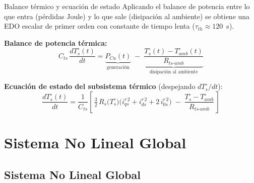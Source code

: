 \documentclass[aspectratio=169,t]{beamer}
\newcommand{\SecPresentacion}{Presentación del problema}
\newcommand{\SecMecanico}{Subsistema mecánico equivalente}
\newcommand{\SecElectromagnetico}{Subsistema electromagnético en coordenadas qd0}
\newcommand{\SecTermico}{Subsistema térmico}
\newcommand{\SecNLGlobal}{Sistema No Lineal Global}
\newcommand{\SecLPV}{Linealización Jacobiana (LPV)}
\newcommand{\SecLTI}{Obtención del modelo LTI equivalente}
\newcommand{\SecAnalisisLTI}{Análisis del modelo LTI aumentado}
\newcommand{\SecDinamica}{Respuesta dinámica en dominio del tiempo}
\newcommand{\SecControlador}{Diseño y análisis del controlador en cascada}
\newcommand{\SecVerifSpecs}{Verificación de desempeño: Especificaciones de operación}
\newcommand{\SecVerifOffset}{Verificación de desempeño: Offset de estado estacionario}
\newcommand{\SecVerifNoIdealidades}{Verificación de desempeño: No idealidades y comportamiento térmico}
\newcommand{\SecDiscretizacion}{Discretización del controlador}
\newcommand{\SecSoftware}{Codificación del software de control}
\newcommand{\AgendaItem}[3]{%
  \ifnum#1=#2
    {\scriptsize\bfseries\color{uncBlue}%
      \hyperlink{sec:#1}{\makebox[2.2em][r]{#1.}\hspace{0.7em}%
      \parbox[t]{0.86\textwidth}{#3}}\par}%
  \else
    {\scriptsize\color{black!26}%
      \hyperlink{sec:#1}{\makebox[2.2em][r]{#1.}\hspace{0.7em}%
      \parbox[t]{0.86\textwidth}{#3}}\par}%
  \fi
  \vspace{0.35mm}%
}
\newcommand{\AgendaBody}[1]{%
    \vspace{3mm}
    {\Large\bfseries\color{uncBlue}Tabla de contenidos\par}
    \vspace{2mm}
    \begin{minipage}{0.94\textwidth}
      \AgendaItem{1}{#1}{\SecPresentacion}
      \AgendaItem{2}{#1}{\SecMecanico}
      \AgendaItem{3}{#1}{\SecElectromagnetico}
      \AgendaItem{4}{#1}{\SecTermico}
      \AgendaItem{5}{#1}\SecNLGlobal
      \AgendaItem{6}{#1}{\SecLPV}
      \AgendaItem{7}{#1}{\SecLTI}
      \AgendaItem{8}{#1}{\SecAnalisisLTI}
      \AgendaItem{9}{#1}{\SecDinamica}
      \AgendaItem{10}{#1}{\SecControlador}
      \AgendaItem{11}{#1}{\SecVerifSpecs}
      \AgendaItem{12}{#1}{\SecVerifOffset}
      \AgendaItem{13}{#1}{\SecVerifNoIdealidades}
      \AgendaItem{14}{#1}{\SecDiscretizacion}
      \AgendaItem{15}{#1}{\SecSoftware}
    \end{minipage}
    \vfill
}
\newcommand{\AgendaSlideTarget}[2]{%
  \begin{frame}[plain]
    \hypertarget{#2}{}%
    \AgendaBody{#1}
  \end{frame}
}
\newcommand{\StartProjectSection}[2]{%
  \section{#2}%
  \subsection{#2}%
  \AgendaSlideTarget{#1}{sec:#1}%
}
\begin{document}
\begin{frame}{Balance térmico y ecuación de estado}
{\small\color{uncGray}Aplicando el balance de potencia entre lo que entra (pérdidas Joule) y lo que sale (disipación al ambiente) se obtiene una EDO escalar de primer orden con constante de tiempo lenta ($\tau_{th}\approx 120$~s).}\par
\vspace{3mm}

\textbf{Balance de potencia térmica:}
\begin{equation*}
C_{ts}\,\frac{dT_s^\circ(t)}{dt} = \underbrace{P_{Cu}(t)}_{\text{generación}} \;-\; \underbrace{\frac{T_s^\circ(t) - T_{amb}^\circ(t)}{R_{ts\text{-}amb}}}_{\text{disipación al ambiente}}
\end{equation*}

\textbf{Ecuación de estado del subsistema térmico} (despejando $dT_s^\circ/dt$):
\begin{equation*}
\frac{dT_s^\circ(t)}{dt} = \frac{1}{C_{ts}}\!\left[\,\tfrac{3}{2}\,R_s\!\big(T_s^\circ\big)\big(i_{qs}^{r\,2}+i_{ds}^{r\,2}+2\,i_{0s}^{r\,2}\big) \;-\; \frac{T_s^\circ - T_{amb}^\circ}{R_{ts\text{-}amb}}\,\right]
\end{equation*}

\end{frame}
\StartProjectSection{5}{\SecNLGlobal}
\end{document}
